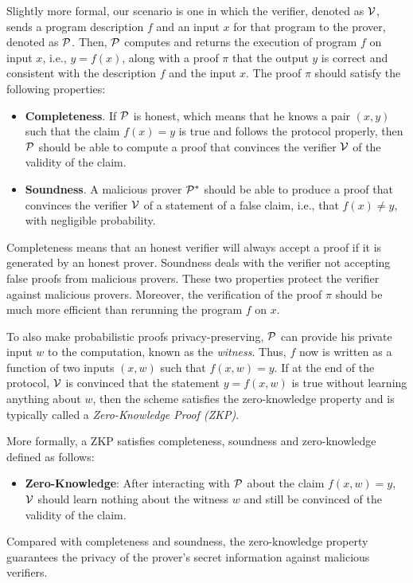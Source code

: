 Slightly more formal, our scenario is one in which the verifier, denoted as $\V$, sends a program description $f$ and an input $x$ for that program to the prover, denoted as $\P$. Then, $\P$ computes and returns the execution of program $f$ on input $x$, i.e., $y = f(x)$, along with a proof $\pi$ that the output $y$ is correct and consistent with the description $f$ and the input $x$. The proof $\pi$ should satisfy the following properties:
\begin{itemize}
	\item \textbf{Completeness}. If $\P$ is honest, which means that he knows a pair $(x,y)$ such that the claim $f(x) = y$ is true and follows the protocol properly, then $\P$ should be able to compute a proof that convinces the verifier $\V$ of the validity of the claim.

	\item \textbf{Soundness}. A malicious prover $\P^*$ should be able to produce a proof that convinces the verifier $\V$ of a statement of a false claim, i.e., that $f(x) \neq y$, with negligible probability.
\end{itemize}
Completeness means that an honest verifier will always accept a proof if it is generated by an honest prover. Soundness deals with the verifier not accepting false proofs from malicious provers. These two properties protect the verifier against malicious provers. Moreover, the verification of the proof $\pi$ should be much more efficient than rerunning the program $f$ on $x$.

To also make probabilistic proofs privacy-preserving, $\P$ can provide his private input $w$ to the computation, known as the \textit{witness}. Thus, $f$ now is written as a function of two inputs $(x,w)$ such that $f(x,w) = y$. If at the end of the protocol, $\V$ is convinced that the statement $y = f(x,w)$ is true without learning anything about $w$, then the scheme satisfies the zero-knowledge property and is typically called a \textit{Zero-Knowledge Proof (ZKP)}.

More formally, a ZKP satisfies completeness, soundness and zero-knowledge defined as follows:
\begin{itemize}
	\item \textbf{Zero-Knowledge}: After interacting with $\P$ about the claim $f(x,w) = y$, $\V$ should learn nothing about the witness $w$ and still be convinced of the validity of the claim.
\end{itemize}
Compared with completeness and soundness, the zero-knowledge property guarantees the privacy of the prover's secret information against malicious verifiers.


